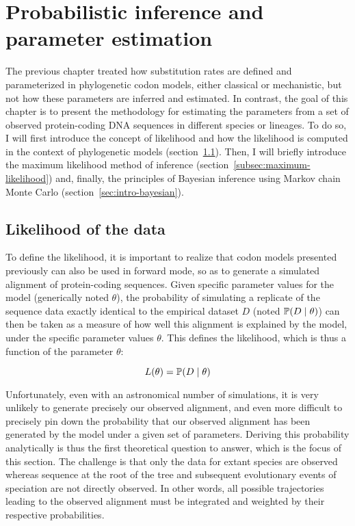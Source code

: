 \chapter{Probabilistic inference and parameter estimation}
{\hypersetup{linkcolor=GREYDARK}\minitoc}
\label{chap:intro-inference}

The previous chapter treated how \gls{substitution} rates are defined and parameterized in phylogenetic \gls{codon} models, either classical or mechanistic, but not how these parameters are inferred and estimated.
In contrast, the goal of this chapter is to present the methodology for estimating the parameters from a set of observed protein-coding \acrshort{DNA} sequences in different species or lineages.
To do so, I will first introduce the concept of \gls{likelihood} and how the \gls{likelihood} is computed in the context of phylogenetic models (section~\ref{sec-intro:likelihood}).
Then, I will briefly introduce the maximum \gls{likelihood} method of inference (section~\ref{subsec:maximum-likelihood}) and, finally, the principles of Bayesian inference using \gls{Markov chain Monte Carlo} (section~\ref{sec:intro-bayesian}).


\section{Likelihood of the data}
\label{sec-intro:likelihood}

To define the \gls{likelihood}, it is important to realize that \gls{codon} models presented previously can also be used in forward mode, so as to generate a simulated alignment of protein-coding sequences.
Given specific parameter values for the model (generically noted $\theta$), the probability of simulating a replicate of the sequence data exactly identical to the empirical dataset $D$ (noted $\mathbb{P} (D \mid \theta)$) can then be taken as a measure of how well this alignment is explained by the model, under the specific parameter values $\theta$.
This defines the \gls{likelihood}, which is thus a function of the parameter $\theta$:

\begin{equation}
    L(\theta) = \mathbb{P} (D \mid \theta)
\end{equation}

Unfortunately, even with an astronomical number of simulations, it is very unlikely to generate precisely our observed alignment, and even more difficult to precisely pin down the probability that our observed alignment has been generated by the model under a given set of parameters.
Deriving this probability analytically is thus the first theoretical question to answer, which is the focus of this section.
The challenge is that only the data for extant species are observed whereas sequence at the root of the tree and subsequent evolutionary events of speciation are not directly observed.
In other words, all possible trajectories leading to the observed alignment must be integrated and weighted by their respective probabilities.

